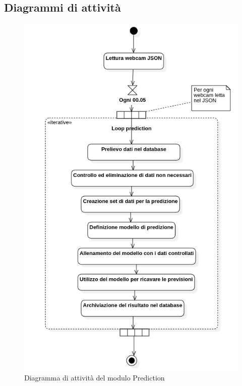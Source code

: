 \subsection{Diagrammi di attività}\label{DiagrammaDiAttivitaPrediction}
\begin{center}
	\begin{figure}[H]
		\centering\includegraphics[scale=0.60]{../immagini/diag_PB/prediction_activity.png}
		\caption{Diagramma di attività del modulo Prediction}
	\end{figure}
\end{center}


